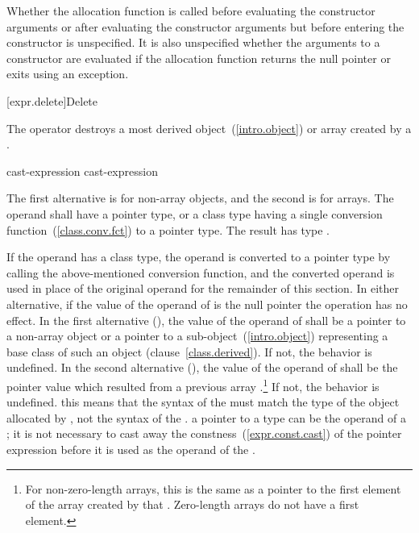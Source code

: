 \pnum
Whether the allocation function is called before evaluating the
constructor arguments or after evaluating the constructor arguments but
before entering the constructor is unspecified. It is also unspecified
whether the arguments to a constructor are evaluated if the allocation
function returns the null pointer or exits using an exception.

[expr.delete]{Delete}

\pnum
{}%
%
The  operator destroys a most derived
object~(\ref{intro.object}) or array created by a
.

\begin{bnf}
\br
    \terminal{::}\opt {} cast-expression\br
    \terminal{::}\opt {} cast-expression
\end{bnf}

The first alternative is for non-array objects, and the second is for arrays.
The operand shall have a pointer type, or a class type having a single
conversion function~(\ref{class.conv.fct}) to a pointer
type. The result has type .

\pnum
{}%
If the operand has a class type, the operand is converted to a pointer
type by calling the above-mentioned conversion function, and the
converted operand is used in place of the original operand for the
remainder of this section. In either alternative, if the value of the
operand of  is the null pointer the operation has no effect.
%
In the first alternative
(), the value of the operand of  shall
be a pointer to a non-array object or a pointer to a
sub-object~(\ref{intro.object}) representing a base class of such an
object (clause~\ref{class.derived}). If not, the behavior is undefined.
%
%
In the second alternative (), the value of the
operand of  shall be the pointer value which resulted from
a previous array .\footnote{For non-zero-length
arrays, this is the same as a pointer to the first
element of the array created by that .
Zero-length arrays do not have a first element.}
If not, the behavior is undefined.
\enternote 
this means that the syntax of the  must
match the type of the object allocated by , not the syntax of the
.
\exitnote 
\enternote 
a pointer to a  type can be the operand of a
; it is not necessary to cast away the
constness~(\ref{expr.const.cast}) of the pointer expression before it is
used as the operand of the .
\exitnote 

